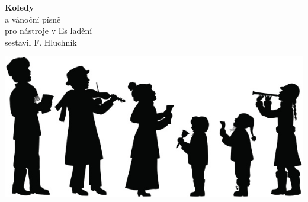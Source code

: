\vspace*{100pt}
\begin{center}
\fontsize{50}{60}\selectfont
\textbf{Koledy}\\
\vspace*{20pt}
\fontsize{30}{40}\selectfont
a vánoční písně\\
\vspace*{30pt}
\fontsize{15}{20}\selectfont
pro nástroje v Es ladění\\
\vspace*{\fill}
\fontsize{12}{20}\selectfont
sestavil F. Hluchník

\vspace*{\fill}
\hspace{-50pt}\includegraphics[scale=3]{musicians.jpg}
\end{center}
\newpage